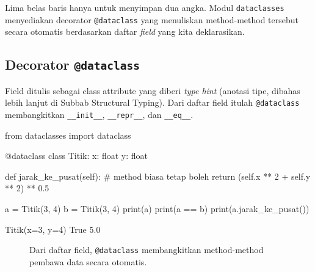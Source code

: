 Lima belas baris hanya untuk menyimpan dua angka. Modul \texttt{dataclasses} menyediakan decorator \texttt{@dataclass} yang menuliskan method-method tersebut secara otomatis berdasarkan daftar \emph{field} yang kita deklarasikan.

\subsection{Decorator \texttt{@dataclass}}

Field ditulis sebagai class attribute yang diberi \emph{type hint} (anotasi tipe, dibahas lebih lanjut di Subbab Structural Typing). Dari daftar field itulah \texttt{@dataclass} membangkitkan \texttt{\_\_init\_\_}, \texttt{\_\_repr\_\_}, dan \texttt{\_\_eq\_\_}.

\begin{kode}
from dataclasses import dataclass

@dataclass
class Titik:
    x: float
    y: float

    def jarak_ke_pusat(self):              # method biasa tetap boleh
        return (self.x ** 2 + self.y ** 2) ** 0.5

a = Titik(3, 4)
b = Titik(3, 4)
print(a)
print(a == b)
print(a.jarak_ke_pusat())
\end{kode}

\begin{keluaran}
Titik(x=3, y=4)
True
5.0
\end{keluaran}

\begin{figure}[htbp]
\centering
{}
\caption{Dari daftar field, \texttt{@dataclass} membangkitkan method-method pembawa data secara otomatis.}
\end{figure}

